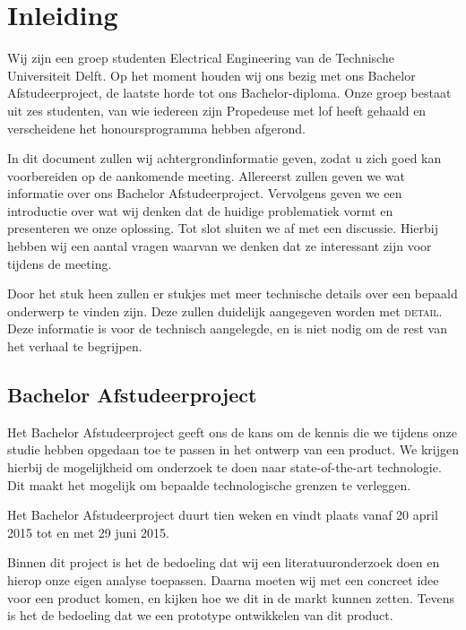 \documentclass[oneside, a4paper, openany]{memoir}
\begin{document}


\frontmatter
\setcounter{page}{5}
\begin{titlingpage}
  \pagestyle{empty}
  \titleGM
\end{titlingpage}

\tableofcontents

\clearpage
\mainmatter

\chapter{Inleiding}
Wij zijn een groep studenten Electrical Engineering van de Technische Universiteit Delft. Op het moment houden wij ons bezig met ons Bachelor Afstudeerproject, de laatste horde tot ons Bachelor-diploma. Onze groep bestaat uit zes studenten, van wie iedereen zijn Propedeuse met lof heeft gehaald en verscheidene het honoursprogramma hebben afgerond.

In dit document zullen wij achtergrondinformatie geven, zodat u zich goed kan voorbereiden op de aankomende meeting. Allereerst zullen geven we wat informatie over ons Bachelor Afstudeerproject. Vervolgens geven we een introductie over wat wij denken dat de huidige problematiek vormt en presenteren we onze oplossing. Tot slot sluiten we af met een discussie. Hierbij hebben wij een aantal vragen waarvan we denken dat ze interessant zijn voor tijdens de meeting.

Door het stuk heen zullen er stukjes met meer technische details over een bepaald onderwerp te vinden zijn. Deze zullen duidelijk aangegeven worden met \textsc{detail}. Deze informatie is voor de technisch aangelegde, en is niet nodig om de rest van het verhaal te begrijpen.

\section{Bachelor Afstudeerproject}
Het Bachelor Afstudeerproject geeft ons de kans om de kennis die we tijdens onze studie hebben opgedaan toe te passen in het ontwerp van een product. We krijgen hierbij de mogelijkheid om onderzoek te doen naar state-of-the-art technologie. Dit maakt het mogelijk om bepaalde technologische grenzen te verleggen.

Het Bachelor Afstudeerproject duurt tien weken en vindt plaats vanaf 20 april 2015 tot en met 29 juni 2015.

Binnen dit project is het de bedoeling dat wij een literatuuronderzoek doen en hierop onze eigen analyse toepassen. Daarna moeten wij met een concreet idee voor een product komen, en kijken hoe we dit in de markt kunnen zetten. Tevens is het de bedoeling dat we een prototype ontwikkelen van dit product.
\end{document}
